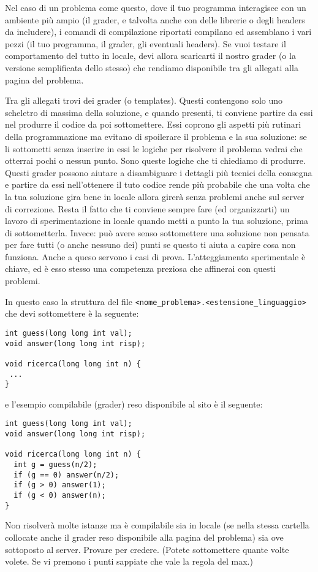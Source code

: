 \documentclass[a4paper,11pt]{article}
\begin{document}
  Nel caso di un problema come questo, dove il tuo programma interagisce
  con un ambiente pi\`u ampio (il grader, e talvolta anche con delle librerie o degli headers da includere), i comandi di compilazione riportati compilano ed assemblano i vari pezzi (il tuo programma, il grader, gli eventuali headers).
  Se vuoi testare il comportamento del tutto in locale,
  devi allora scaricarti il nostro grader (o la versione semplificata dello stesso) che rendiamo disponibile tra gli allegati alla pagina del problema.

  Tra gli allegati trovi dei grader (o templates). Questi contengono solo uno scheletro di massima della soluzione, e quando presenti, ti conviene partire da essi nel produrre il codice da poi sottomettere. Essi coprono gli aspetti più rutinari della programmazione ma evitano di spoilerare il problema e la sua soluzione: se li sottometti senza inserire in essi le logiche per risolvere il problema vedrai che otterrai pochi o nessun punto. Sono queste logiche che ti chiediamo di produrre. Questi grader possono aiutare a disambiguare i dettagli più tecnici della consegna e partire da essi nell'ottenere il tuto codice rende più probabile che una volta che la tua soluzione gira bene in locale allora girerà senza problemi anche sul server di correzione. Resta il fatto che ti conviene sempre fare (ed organizzarti) un lavoro di sperimentazione in locale quando metti a punto la tua soluzione, prima di sottometterla. Invece: può avere senso sottomettere una soluzione non pensata per fare tutti (o anche nessuno dei) punti se questo ti aiuta a capire cosa non funziona. Anche a queso servono i casi di prova. L'atteggiamento sperimentale è chiave, ed è esso stesso una competenza preziosa che affinerai con questi problemi. 
  
  In questo caso la struttura del file \texttt{<nome\_problema>.<estensione\_linguaggio>} che devi sottomettere \`e la seguente:

\begin{verbatim}
int guess(long long int val);
void answer(long long int risp);

void ricerca(long long int n) {
 ...
}
\end{verbatim}
  
e l'esempio compilabile (grader) reso disponibile al sito \`e il seguente:
\begin{verbatim}
int guess(long long int val);
void answer(long long int risp);

void ricerca(long long int n) {
  int g = guess(n/2);
  if (g == 0) answer(n/2);
  if (g > 0) answer(1);
  if (g < 0) answer(n);
}
\end{verbatim}

Non risolver\`a molte istanze ma \`e compilabile sia in locale (se nella stessa cartella collocate anche il grader reso disponibile alla pagina del problema) sia ove sottoposto al server. Provare per credere. (Potete sottomettere quante volte volete. Se vi premono i punti sappiate che vale la regola del max.)
  
\end{document}
